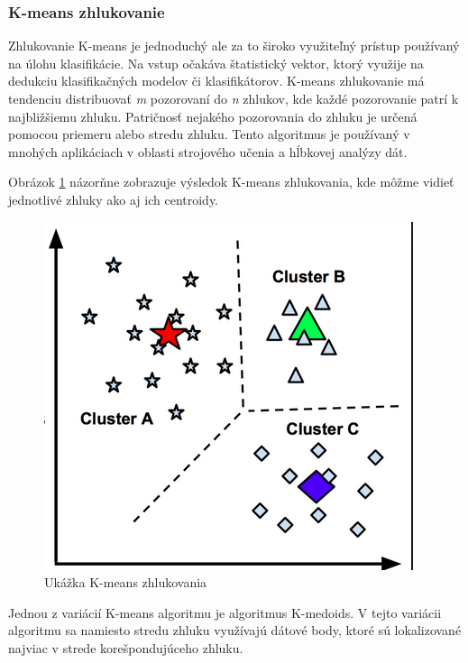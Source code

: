 \subsubsection{K-means zhlukovanie}
Zhlukovanie K-means je jednoduchý ale za to široko využiteľný prístup používaný na úlohu klasifikácie. Na vstup očakáva štatistický vektor, ktorý využije na dedukciu klasifikačných modelov či klasifikátorov. K-means zhlukovanie má tendenciu distribuovať \textit{m} pozorovaní do \textit{n} zhlukov, kde každé pozorovanie patrí k najbližšiemu zhluku. Patričnosť nejakého pozorovania do zhluku je určená pomocou priemeru alebo stredu zhluku. Tento algoritmus je používaný v mnohých aplikáciach v oblasti strojového učenia a hĺbkovej analýzy dát.\par
Obrázok \ref{img:k_means} názorňne zobrazuje výsledok K-means zhlukovania, kde môžme vidieť jednotlivé zhluky ako aj ich centroidy.
\begin{figure}[H]
	\begin{center}
		\includegraphics[scale=0.55]{img/k_means.png}
		\caption{Ukážka K-means zhlukovania}
		\label{img:k_means}
	\end{center}
\end{figure}
Jednou z variácií K-means algoritmu je algoritmus K-medoids. V tejto variácii algoritmu sa namiesto stredu zhluku využívajú dátové body, ktoré sú lokalizované najviac v strede korešpondujúceho zhluku.
